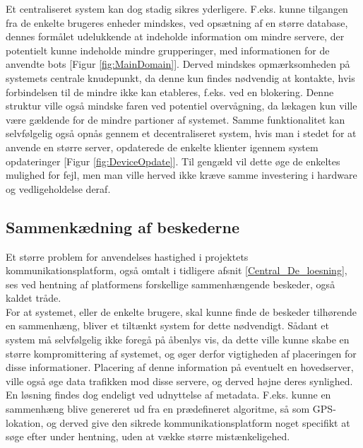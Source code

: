 Et centraliseret system kan dog stadig sikres yderligere. F.eks. kunne tilgangen fra de enkelte brugeres enheder mindskes, ved opsætning af en større database, dennes formålet udelukkende at indeholde information om mindre servere, der potentielt kunne indeholde mindre grupperinger, med informationen for de anvendte bots [Figur \ref{fig:MainDomain}]. Derved mindskes opmærksomheden på systemets centrale knudepunkt, da denne kun findes nødvendig at kontakte, hvis forbindelsen til de mindre ikke kan etableres, f.eks. ved en blokering. Denne struktur ville også mindske faren ved potentiel overvågning, da lækagen kun ville være gældende for de mindre partioner af systemet.
Samme funktionalitet kan selvfølgelig også opnås gennem et decentraliseret system, hvis man i stedet for at anvende en større server, opdaterede de enkelte klienter igennem system opdateringer [Figur \ref{fig:DeviceOpdate}]. Til gengæld vil dette øge de enkeltes mulighed for fejl, men man ville herved ikke kræve samme investering i hardware og vedligeholdelse deraf.

\subsection{Sammenkædning af beskederne}
Et større problem for anvendelses hastighed i projektets kommunikationsplatform, også omtalt i tidligere afsnit \ref{Central_De_loesning}, ses ved hentning af platformens forskellige sammenhængende beskeder, også kaldet tråde.\\
For at systemet, eller de enkelte brugere, skal kunne finde de beskeder tilhørende en sammenhæng, bliver et tiltænkt system for dette nødvendigt. Sådant et system må selvfølgelig ikke foregå på åbenlys vis, da dette ville kunne skabe en større kompromittering af systemet, og øger derfor vigtigheden af placeringen for disse informationer. Placering af denne information på eventuelt en hovedserver, ville også øge data trafikken mod disse servere, og derved højne deres synlighed. En løsning findes dog endeligt ved udnyttelse af metadata. F.eks. kunne en sammenhæng blive genereret ud fra en prædefineret algoritme, så som GPS-lokation, og derved give den sikrede kommunikationsplatform noget specifikt at søge efter under hentning, uden at vække større mistænkeligehed. 


